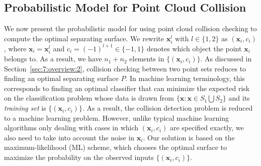 \subsection{Probabilistic Model for Point Cloud Collision}
We now present the probabilistic model for using point cloud collision checking to compute the optimal separating surface. We rewrite $\mathbf x_i^l$ with $l\in \{1,2\}$ as $(\mathbf x_i, c_i)$, where $\mathbf x_i = \mathbf x_i^l$ and $c_i = (-1)^{l+1} \in \{-1, 1\}$ denotes which object the point $\mathbf x_i$ belongs to.
As a result, we have $n_1 + n_2$ elements in $\{(\mathbf x_i, c_i)\}$. As discussed in Section~\ref{sec:7:overview:2}, collision checking between two point sets reduces
to finding an optimal separating surface $P$. In machine learning terminology, this corresponds to finding an optimal classifier that can minimize the expected risk on the classification problem whose data is drawn
from $\{ \mathbf x: \mathbf x \in S_1 \bigcup S_2\}$ and its {\em training set} is $\{(\mathbf x_i, c_i)\}$. As a result, the collision detection problem is reduced to a
machine learning problem. However, unlike typical machine learning algorithms only dealing with cases in which $(\mathbf x_i, c_i)$ are specified exactly, we also need to take into account the noise in $\mathbf x_i$. Our solution is based on the maximum-likelihood (ML) scheme, which chooses the optimal surface to maximize the probability on the observed inputs $\{(\mathbf x_i, c_i)\}$.

